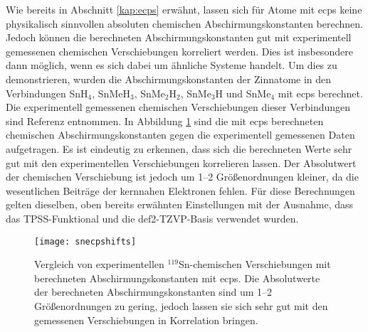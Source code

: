 Wie bereits in Abschnitt \ref{kap:ecps} erwähnt, lassen sich für Atome mit \acp{ecp} keine physikalisch sinnvollen absoluten chemischen Abschirmungskonstanten berechnen. Jedoch können die berechneten Abschirmungskonstanten gut mit experimentell gemessenen chemischen Verschiebungen korreliert werden. Dies ist insbesondere dann möglich, wenn es sich dabei um ähnliche Systeme handelt. Um dies zu demonstrieren, wurden die Abschirmungskonstanten der Zinnatome in den Verbindungen SnH$_4$, SnMeH$_3$, SnMe$_2$H$_2$, SnMe$_3$H und SnMe$_4$ mit \acp{ecp} berechnet. Die experimentell gemessenen chemischen Verschiebungen dieser Verbindungen sind Referenz \cite{vivas2002dft} entnommen. In Abbildung \ref{abb:snecpshifts} sind die mit \acp{ecp} berechneten chemischen Abschirmungskonstanten gegen die experimentell gemessenen Daten aufgetragen. Es ist eindeutig zu erkennen, dass sich die berechneten Werte sehr gut mit den experimentellen Verschiebungen korrelieren lassen. Der Absolutwert der chemischen Verschiebung ist jedoch um 1--2 Größenordnungen kleiner, da die wesentlichen Beiträge der kernnahen Elektronen fehlen. Für diese Berechnungen gelten dieselben, oben bereits erwähnten Einstellungen mit der Ausnahme, dass das TPSS-Funktional\supercite{tao2003climbing} und die def2-TZVP-Basis\supercite{weigend2005balanced} verwendet wurden.
\begin{figure}[ht!]
	\centering
	\texttt{[image: snecpshifts]}
	\captionsetup{figurewithin = chapter}
	\captionsetup{font=small, labelfont=bf}\caption[Vergleich von experimentellen $^{119}$Sn-chemischen Verschiebungen mit berechneten Abschirmungskonstanten]{Vergleich von experimentellen $^{119}$Sn-chemischen Verschiebungen mit berechneten Abschirmungskonstanten mit \acp{ecp}. Die Absolutwerte der berechneten Abschirmungskonstanten sind um 1--2 Größenordnungen zu gering, jedoch lassen sie sich sehr gut mit den gemessenen Verschiebungen in Korrelation bringen.}
\label{abb:snecpshifts}
\end{figure}
	
